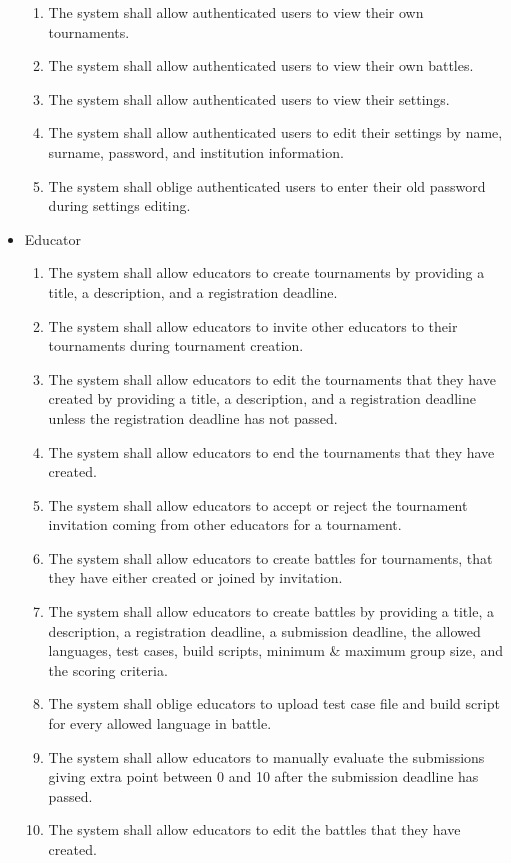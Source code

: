 \begin{itemize}
\begin{enumerate}
  \item The system shall allow authenticated users to view their own tournaments. 
  \item The system shall allow authenticated users to view their own battles. 
  \item The system shall allow authenticated users to view their settings.
  \item The system shall allow authenticated users to edit their settings by name, surname, password, and institution information.
  \item The system shall oblige authenticated users to enter their old password during settings editing.

	\end{enumerate}
	\item Educator
        \begin{enumerate}[resume]
            \item The system shall allow educators to create tournaments by providing a title, a description, and a registration deadline.
            \item The system shall allow educators to invite other educators to their tournaments during tournament creation.
            \item The system shall allow educators to edit the tournaments that they have created by providing a title, a description, and a registration deadline unless the registration deadline has not passed.
            \item The system shall allow educators to end the tournaments that they have created.
            \item The system shall allow educators to accept or reject the tournament invitation coming from other educators for a tournament.
            \item The system shall allow educators to create battles for tournaments, that they have either created or joined by invitation. 
            \item The system shall allow educators to create battles by providing a title, a description, a registration deadline, a submission deadline, the allowed languages, test cases, build scripts, minimum \& maximum group size, and the scoring criteria.
            \item The system shall oblige educators to upload test case file and build script for every allowed language in battle.
		\item The system shall allow educators to manually evaluate the submissions giving extra point between 0 and 10 after the submission deadline has passed.
            \item The system shall allow educators to edit the battles that they have created.
	\end{enumerate}




\end{itemize}
